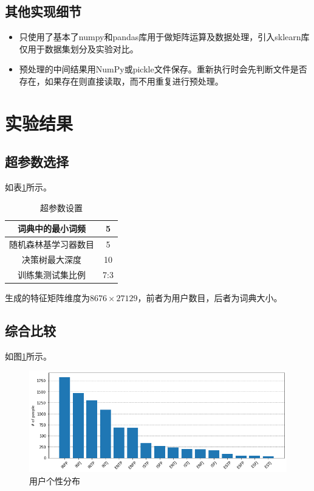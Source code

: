\documentclass[logo,reportComp]{thesis}
\begin{document}
\subsection{其他实现细节}
\begin{itemize}
\item 只使用了基本了numpy和pandas库用于做矩阵运算及数据处理，引入sklearn库仅用于数据集划分及实验对比。
\item 预处理的中间结果用NumPy或pickle文件保存。重新执行时会先判断文件是否存在，如果存在则直接读取，而不用重复进行预处理。
\end{itemize}

\section{实验结果}

\subsection{超参数选择}
如表\ref{tab:hyperparam}所示。
\begin{table}[H]
\caption{超参数设置}
\label{tab:hyperparam}
\centering
\begin{tabular}{|c|c|}\hline
词典中的最小词频 & 5 \\\hline
随机森林基学习器数目 & 5\\\hline
决策树最大深度 & 10\\\hline
训练集测试集比例 & 7:3\\\hline
\end{tabular}
\end{table}

生成的特征矩阵维度为$8676\times 27129$，前者为用户数目，后者为词典大小。

\subsection{综合比较}
如图\ref{fig:distribution}所示。
\begin{figure}[H]
\centering
\includegraphics[width=0.8\linewidth]{fig/distribution.png}
\caption{用户个性分布}
\label{fig:distribution}
\end{figure}
\end{document}
